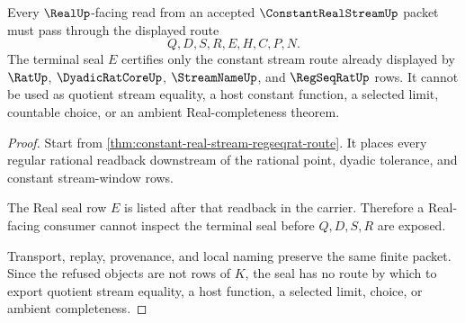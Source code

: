 \begin{theorem}
\label{thm:constant-real-stream-real-seal-nonescape}
Every $\RealUp$-facing read from an accepted $\ConstantRealStreamUp$ packet must pass through the displayed route
$$
Q,D,S,R,E,H,C,P,N .
$$
The terminal seal $E$ certifies only the constant stream route already displayed by $\RatUp$, $\DyadicRatCoreUp$, $\StreamNameUp$, and $\RegSeqRatUp$ rows. It cannot be used as quotient stream equality, a host constant function, a selected limit, countable choice, or an ambient Real-completeness theorem.
\end{theorem}
\begin{proof}
Start from \autoref{thm:constant-real-stream-regseqrat-route}. It places every regular rational readback downstream of the rational point, dyadic tolerance, and constant stream-window rows.

The Real seal row $E$ is listed after that readback in the carrier. Therefore a Real-facing consumer cannot inspect the terminal seal before $Q,D,S,R$ are exposed.

Transport, replay, provenance, and local naming preserve the same finite packet. Since the refused objects are not rows of $K$, the seal has no route by which to export quotient stream equality, a host function, a selected limit, choice, or ambient completeness.
\end{proof}




